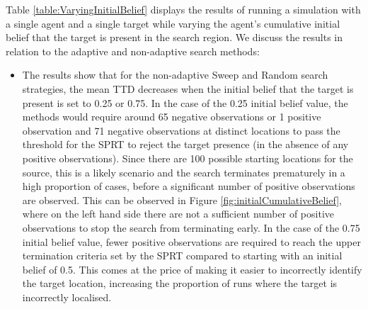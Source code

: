 Table \ref{table:VaryingInitialBelief} displays the results of running a simulation with a single agent and a single target while varying the agent's cumulative initial belief that the target is present in the search region. We discuss the results in relation to the adaptive and non-adaptive search methods:
\begin{itemize}
    \item The results show that for the non-adaptive Sweep and Random search strategies, the mean TTD decreases when the initial belief that the target is present is set to 0.25 or 0.75. In the case of the 0.25 initial belief value, the methods would require around 65 negative observations or 1 positive observation and 71 negative observations at distinct locations to pass the threshold for the SPRT to reject the target presence (in the absence of any positive observations). Since there are 100 possible starting locations for the source, this is a likely scenario and the search terminates prematurely in a high proportion of cases, before a significant number of positive observations are observed. This can be observed in Figure \ref{fig:initialCumulativeBelief}, where on the left hand side there are not a sufficient number of positive observations to stop the search from terminating early. In the case of the 0.75 initial belief value, fewer positive observations are required to reach the upper termination criteria set by the SPRT compared to starting with an initial belief of 0.5. This comes at the price of making it easier to incorrectly identify the target location, increasing the proportion of runs where the target is incorrectly localised. 

\end{itemize}
